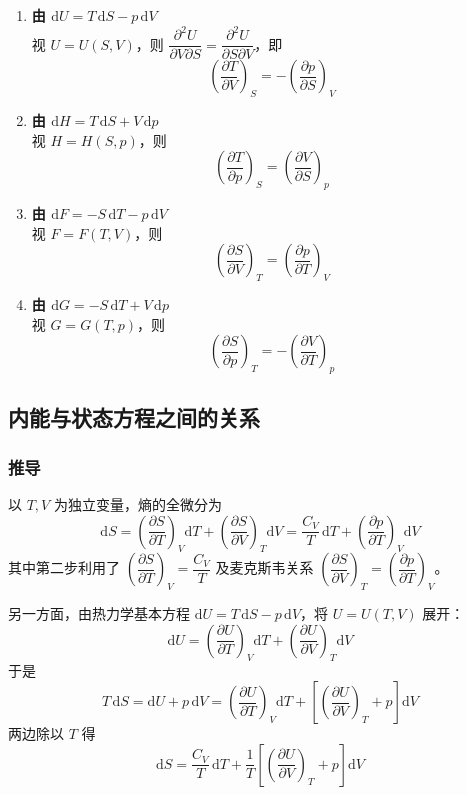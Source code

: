 \documentclass[UTF8]{ctexart}
\begin{document}
\begin{enumerate}[leftmargin=2em]
  \item \textbf{由 $\mathrm{d}U=T\,\mathrm{d}S-p\,\mathrm{d}V$}\\
  视 $U=U(S,V)$，则 $\dfrac{\partial^2 U}{\partial V\partial S}=\dfrac{\partial^2 U}{\partial S\partial V}$，即
  \[
  \boxed{\left(\frac{\partial T}{\partial V}\right)_S=-\left(\frac{\partial p}{\partial S}\right)_V}
  \]

  \item \textbf{由 $\mathrm{d}H=T\,\mathrm{d}S+V\,\mathrm{d}p$}\\
  视 $H=H(S,p)$，则
  \[
  \boxed{\left(\frac{\partial T}{\partial p}\right)_S=\left(\frac{\partial V}{\partial S}\right)_p}
  \]

  \item \textbf{由 $\mathrm{d}F=-S\,\mathrm{d}T-p\,\mathrm{d}V$}\\
  视 $F=F(T,V)$，则
  \[
  \boxed{\left(\frac{\partial S}{\partial V}\right)_T=\left(\frac{\partial p}{\partial T}\right)_V}
  \]

  \item \textbf{由 $\mathrm{d}G=-S\,\mathrm{d}T+V\,\mathrm{d}p$}\\
  视 $G=G(T,p)$，则
  \[
  \boxed{\left(\frac{\partial S}{\partial p}\right)_T=-\left(\frac{\partial V}{\partial T}\right)_p}
  \]
\end{enumerate}


\subsection{内能与状态方程之间的关系}

\subsubsection{推导}

以 $T,V$ 为独立变量，熵的全微分为
\[
\mathrm{d}S=\left(\frac{\partial S}{\partial T}\right)_V\mathrm{d}T
+\left(\frac{\partial S}{\partial V}\right)_T\mathrm{d}V
=\frac{C_V}{T}\,\mathrm{d}T+\left(\frac{\partial p}{\partial T}\right)_V\mathrm{d}V
\]
其中第二步利用了 $\left(\dfrac{\partial S}{\partial T}\right)_V=\dfrac{C_V}{T}$ 及麦克斯韦关系 $\left(\dfrac{\partial S}{\partial V}\right)_T=\left(\dfrac{\partial p}{\partial T}\right)_V$。

另一方面，由热力学基本方程 $\mathrm{d}U=T\,\mathrm{d}S-p\,\mathrm{d}V$，将 $U=U(T,V)$ 展开：
\[
\mathrm{d}U=\left(\frac{\partial U}{\partial T}\right)_V\mathrm{d}T
+\left(\frac{\partial U}{\partial V}\right)_T\mathrm{d}V
\]
于是
\[
T\,\mathrm{d}S=\mathrm{d}U+p\,\mathrm{d}V
=\left(\frac{\partial U}{\partial T}\right)_V\mathrm{d}T
+\left[\left(\frac{\partial U}{\partial V}\right)_T+p\right]\mathrm{d}V
\]
两边除以 $T$ 得
\[
\mathrm{d}S=\frac{C_V}{T}\,\mathrm{d}T
+\frac{1}{T}\left[\left(\frac{\partial U}{\partial V}\right)_T+p\right]\mathrm{d}V
\]
\end{document}

